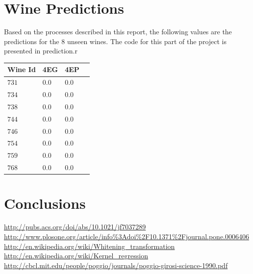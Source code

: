 \documentclass[twocolumn]{article}
\begin{document}
\section{Wine Predictions}
Based on the processes described in this report, the following values are the predictions for the 8 unseen wines. The code for this part
of the project is presented in prediction.r

\begin{center}
	\begin{tabular}{| p{15mm} | p{15mm} | p{15mm} | p{15mm} | }
	\hline Wine Id & 4EG & 4EP \\ \hline
	\( 731\) & 0.0 & 0.0 \\ \hline
	\( 734\) & 0.0 & 0.0 \\ \hline
	\( 738\) & 0.0 & 0.0 \\ \hline
	\( 744\) & 0.0 & 0.0 \\ \hline
	\( 746\) & 0.0 & 0.0 \\ \hline
	\( 754\) & 0.0 & 0.0 \\ \hline
	\( 759\) & 0.0 & 0.0 \\ \hline
	\( 768\) & 0.0 & 0.0 \\ \hline
	\end{tabular} 
\end{center}

\section{Conclusions}

\begin{thebibliography}{9}
 \url{http://pubs.acs.org/doi/abs/10.1021/jf7037289}
 \url{http://www.plosone.org/article/info%3Adoi%2F10.1371%2Fjournal.pone.0006406}
 \url{http://en.wikipedia.org/wiki/Whitening_transformation}
 \url{http://en.wikipedia.org/wiki/Kernel_regression}
 \url{http://cbcl.mit.edu/people/poggio/journals/poggio-girosi-science-1990.pdf}
\end{thebibliography}
\end{document}
